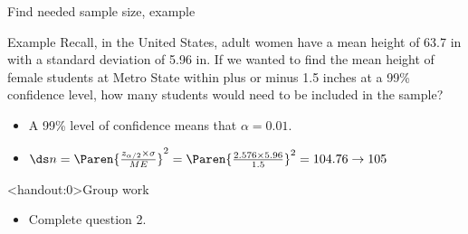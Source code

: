 \documentclass[xcolor=table]{beamer}
\begin{document}
\begin{frame}{Find needed sample size, example}
\begin{exampleblock}{Example}
Recall, in the United States, adult women have a mean height of 63.7 in with a standard deviation of 5.96 in. If we wanted to find the mean height of female students at Metro State within plus or minus 1.5 inches at a 99\% confidence level, how many students would need to be included in the sample?

\begin{itemize}
\pause\item A 99\% level of confidence means that $\alpha = 0.01$.
\pause\item $\ds n = \Paren{\frac{z_{\alpha/2} \times \sigma}{ME}}^2= \Paren{\frac{2.576 \times 5.96}{1.5}}^2 = 104.76 \to 105$
\end{itemize}
\end{exampleblock}
\end{frame}

\begin{frame}<handout:0>{Group work}
\begin{block}{}
\large
\begin{itemize}
\item Complete question 2.
\end{itemize}
\end{block}
\end{frame}
\end{document}
